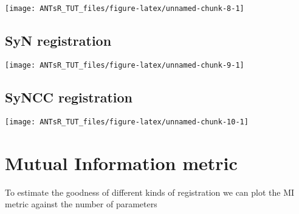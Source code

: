 \documentclass[]{tufte-handout}
\newenvironment{Shaded}{}{}
\newcommand{\DataTypeTok}[1]{\textcolor[rgb]{0.56,0.13,0.00}{#1}}
\newcommand{\KeywordTok}[1]{\textcolor[rgb]{0.00,0.44,0.13}{\textbf{#1}}}
\newcommand{\NormalTok}[1]{#1}
\newcommand{\OperatorTok}[1]{\textcolor[rgb]{0.40,0.40,0.40}{#1}}
\newcommand{\StringTok}[1]{\textcolor[rgb]{0.25,0.44,0.63}{#1}}
\begin{document}
\texttt{[image: ANTsR\_TUT\_files/figure-latex/unnamed-chunk-8-1]}

\hypertarget{syn-registration}{%
\subsection{SyN registration}\label{syn-registration}}

\begin{Shaded}
\end{Shaded}

\texttt{[image: ANTsR\_TUT\_files/figure-latex/unnamed-chunk-9-1]}

\hypertarget{syncc-registration}{%
\subsection{SyNCC registration}\label{syncc-registration}}

\begin{Shaded}
\end{Shaded}

\texttt{[image: ANTsR\_TUT\_files/figure-latex/unnamed-chunk-10-1]}

\hypertarget{mutual-information-metric}{%
\section{Mutual Information metric}\label{mutual-information-metric}}

To estimate the goodness of different kinds of registration we can plot
the MI metric against the number of parameters
\end{document}
